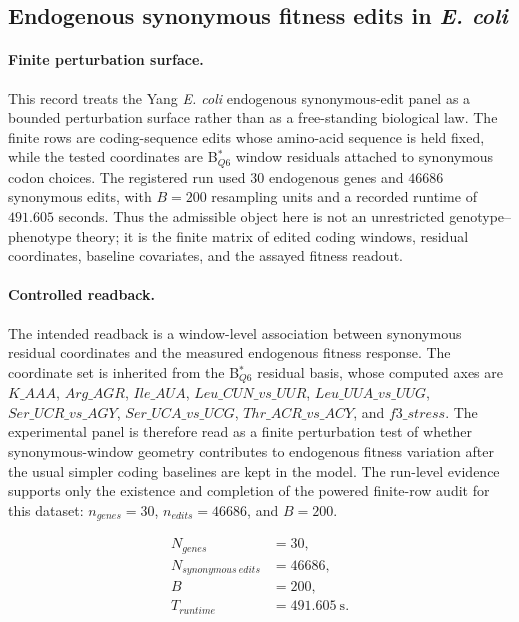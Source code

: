 \subsection{Endogenous synonymous fitness edits in \textit{E. coli}}
\label{sec:bioreality-yang-ecoli-endogenous-fitness}

\paragraph{Finite perturbation surface.}
This record treats the Yang \textit{E. coli} endogenous synonymous-edit panel as a bounded perturbation surface rather than as a free-standing biological law.  The finite rows are coding-sequence edits whose amino-acid sequence is held fixed, while the tested coordinates are B$^{*}_{Q6}$ window residuals attached to synonymous codon choices.  The registered run used $30$ endogenous genes and $46686$ synonymous edits, with $B=200$ resampling units and a recorded runtime of $491.605$ seconds.  Thus the admissible object here is not an unrestricted genotype--phenotype theory; it is the finite matrix of edited coding windows, residual coordinates, baseline covariates, and the assayed fitness readout.

\paragraph{Controlled readback.}
The intended readback is a window-level association between synonymous residual coordinates and the measured endogenous fitness response.  The coordinate set is inherited from the B$^{*}_{Q6}$ residual basis, whose computed axes are $K\_AAA$, $Arg\_AGR$, $Ile\_AUA$, $Leu\_CUN\_vs\_UUR$, $Leu\_UUA\_vs\_UUG$, $Ser\_UCR\_vs\_AGY$, $Ser\_UCA\_vs\_UCG$, $Thr\_ACR\_vs\_ACY$, and $f3\_stress$.  The experimental panel is therefore read as a finite perturbation test of whether synonymous-window geometry contributes to endogenous fitness variation after the usual simpler coding baselines are kept in the model.  The run-level evidence supports only the existence and completion of the powered finite-row audit for this dataset: $n_{genes}=30$, $n_{edits}=46686$, and $B=200$.

$$
\begin{aligned}
N_{genes} &= 30,\\
N_{synonymous\ edits} &= 46686,\\
B &= 200,\\
T_{runtime} &= 491.605\ \mathrm{s}.
\end{aligned}
$$


